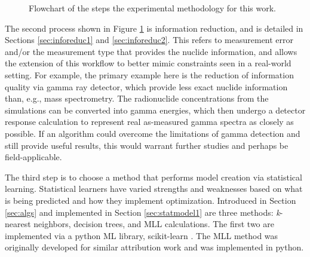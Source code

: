 \begin{figure}[!hbt]
  \caption[Experimental methodology flowchart]
          {Flowchart of the steps the experimental methodology for this work.}
  \label{fig:intromethod}
\end{figure}

The second process shown in Figure \ref{fig:intromethod} is information
reduction, and is detailed in Sections \ref{sec:inforeduc1} and
\ref{sec:inforeduc2}.  This refers to measurement error and/or the measurement
type that provides the nuclide information, and allows the extension of this
workflow to better mimic constraints seen in a real-world setting.  For
example, the primary example here is the reduction of information quality via
gamma ray detector, which provide less exact nuclide information than, e.g.,
mass spectrometry.  The radionuclide concentrations from the simulations can be
converted into gamma energies, which then undergo a detector response
calculation to represent real as-measured gamma spectra as closely as possible.
If an algorithm could overcome the limitations of gamma detection and still
provide useful results, this would warrant further studies and perhaps be
field-applicable.

The third step is to choose a method that performs model creation via
statistical learning.  Statistical learners have varied strengths and
weaknesses based on what is being predicted and how they implement
optimization. Introduced in Section \ref{sec:algs} and implemented in Section
\ref{sec:statmodel1} are three methods: \textit{k}-nearest neighbors, decision
trees, and \gls{MLL} calculations. The first two are implemented via a python
\gls{ML} library, scikit-learn \cite{scikit}. The \gls{MLL} method was
originally developed for similar attribution work \cite{mll_method,
mll_sensitivity, mll_validate} and was implemented in python.

